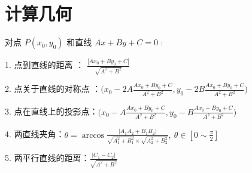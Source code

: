 
\section{计算几何}

对点 $P(x_0,y_0)$ 和直线 $Ax+By+C = 0$ : 

\vspace{0.2cm}

1. 点到直线的距离 ： $\displaystyle \frac{|Ax_0+By_0+C|}{\sqrt{A^2 + B^2}}$ 

\vspace{0.2cm}

2. 点关于直线的对称点 ：$\displaystyle \bigg(x_0-2 A \frac{A x_0+B y_0+C}{A^2+B^2}, y_0-2 B \frac{A x_0+B y_0+C}{A^2+B^2}\bigg)$

\vspace{0.2cm}

3. 点在直线上的投影点：$\displaystyle \bigg(x_0-A \frac{A x_0+B y_0+C}{A^2+B^2},y_0-B \frac{A x_0+B y_0+C}{A^2+B^2}\bigg)$

\vspace{0.2cm}

4. 两直线夹角：$\displaystyle \theta=\arccos \frac{\left|A_1 A_2+B_1 B_2\right|}{\sqrt{A_1^2+B_1^2} \times \sqrt{A_2^2+B_2^2}} ,\ \theta \in\left[0 \sim \frac{\pi}{2}\right]$

\vspace{0.2cm}

5. 两平行直线的距离：$\displaystyle \frac{|C_1-C_2|}{\sqrt{A^2 + B^2}}$

\vspace{0.2cm}



\newpage
